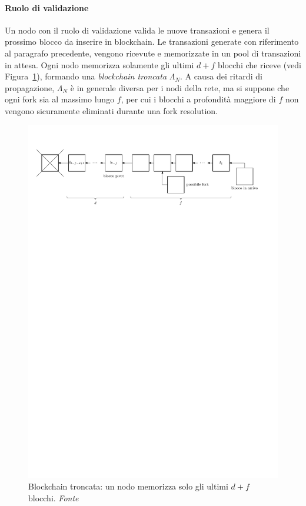 \paragraph*{Ruolo di validazione}
Un nodo con il ruolo di validazione valida le nuove transazioni e genera il prossimo blocco da inserire in blockchain. Le transazioni generate con riferimento al paragrafo precedente, vengono ricevute e memorizzate in un pool di transazioni in attesa. Ogni nodo memorizza solamente gli ultimi $d + f$ blocchi che riceve (vedi Figura~\ref{fig:blockchain_bern}), formando una \emph{blockchain troncata} $\Lambda_N$. A causa dei ritardi di propagazione, $\Lambda_N$ è in generale diversa per i nodi della rete, ma si suppone che ogni fork sia al massimo lungo $f$, per cui i blocchi a profondità maggiore di $f$ non vengono sicuramente eliminati durante una fork resolution.

\begin{figure}
	\centering
	\includegraphics[scale=0.7]{img/capdue/truncated_blockchain.pdf}
	\caption{Blockchain troncata: un nodo memorizza solo gli ultimi $d+f$ blocchi. \emph{Fonte~\cite{bernardini2019blockchains}}}
	\label{fig:blockchain_bern}
\end{figure}

